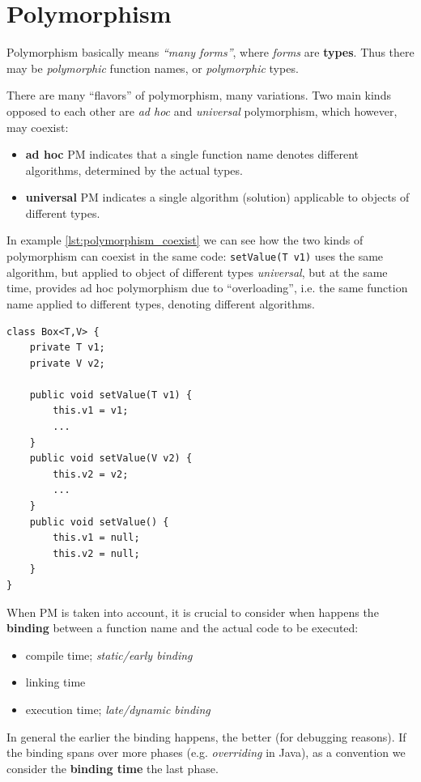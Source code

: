 \chapter{Polymorphism}
Polymorphism basically means \textit{``many forms''}, where \textit{forms} are \textbf{types}.
Thus there may be \textit{polymorphic} function names, or \textit{polymorphic} types.

\begin{paracol}{2}
    
    There are many ``flavors'' of polymorphism, many variations.
    Two main kinds opposed to each other are \textit{ad hoc} and \textit{universal} polymorphism, which however, may coexist:
    \begin{itemize}
        \item \textbf{ad hoc} PM indicates that a single function name denotes different algorithms, determined by the actual types.
        \item \textbf{universal} PM indicates a single algorithm (solution) applicable to objects of different types.
    \end{itemize}

    In example \ref{lst:polymorphism_coexist} we can see how the two kinds of polymorphism can coexist in the same code:
    \lstinline|setValue(T v1)| uses the same algorithm, but applied to object of different types \textit{universal}, but at the same time, provides ad hoc polymorphism due to ``overloading'', i.e. the same function name applied to different types, denoting different algorithms.

    \switchcolumn

    \begin{lstlisting}[label={lst:polymorphism_coexist},caption={Coexistence of ad hoc and universal polymorphism},captionpos=b]
class Box<T,V> {
    private T v1;
    private V v2;

    public void setValue(T v1) {
        this.v1 = v1;
        ...
    }
    public void setValue(V v2) {
        this.v2 = v2;
        ...
    }
    public void setValue() {
        this.v1 = null;
        this.v2 = null;
    }
}
    \end{lstlisting}
\end{paracol}


When PM is taken into account, it is crucial to consider when happens the \textbf{binding} between a function name and the actual code to be executed:
\begin{itemize}
    \item compile time; \textit{static/early binding}
    \item linking time
    \item execution time; \textit{late/dynamic binding}
\end{itemize}
In general the earlier the binding happens, the better (for debugging reasons).
If the binding spans over more phases (e.g. \textit{overriding} in Java), as a convention we consider the \textbf{binding time} the last phase.

